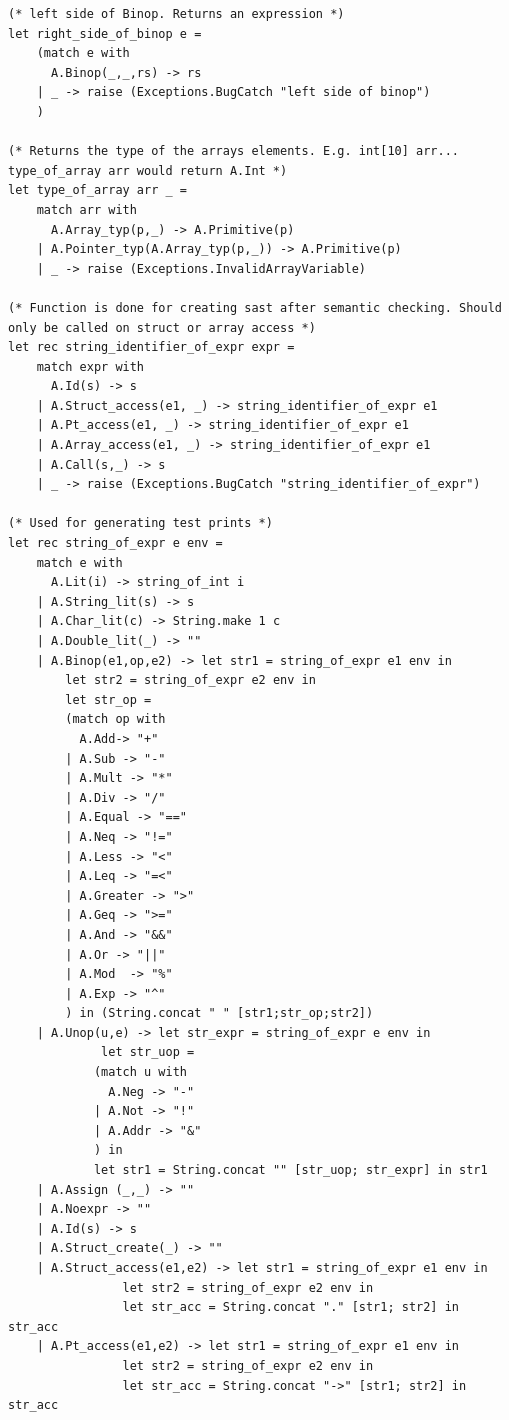 \documentclass{article}
\begin{document}
\begin{lstlisting}
(* left side of Binop. Returns an expression *)
let right_side_of_binop e =
	(match e with 
	  A.Binop(_,_,rs) -> rs
	| _ -> raise (Exceptions.BugCatch "left side of binop")
	)

(* Returns the type of the arrays elements. E.g. int[10] arr... type_of_array arr would return A.Int *)
let type_of_array arr _ =
	match arr with
	  A.Array_typ(p,_) -> A.Primitive(p)
	| A.Pointer_typ(A.Array_typ(p,_)) -> A.Primitive(p)
	| _ -> raise (Exceptions.InvalidArrayVariable)

(* Function is done for creating sast after semantic checking. Should only be called on struct or array access *)
let rec string_identifier_of_expr expr = 
	match expr with
	  A.Id(s) -> s
	| A.Struct_access(e1, _) -> string_identifier_of_expr e1 
	| A.Pt_access(e1, _) -> string_identifier_of_expr e1 
	| A.Array_access(e1, _) -> string_identifier_of_expr e1
	| A.Call(s,_) -> s
	| _ -> raise (Exceptions.BugCatch "string_identifier_of_expr")

(* Used for generating test prints *)
let rec string_of_expr e env =
	match e with 
	  A.Lit(i) -> string_of_int i
  	| A.String_lit(s) -> s
  	| A.Char_lit(c) -> String.make 1 c
  	| A.Double_lit(_) -> ""
  	| A.Binop(e1,op,e2) -> let str1 = string_of_expr e1 env in 
		let str2 = string_of_expr e2 env in 
		let str_op = 
		(match op with
		  A.Add-> "+"
		| A.Sub -> "-"
		| A.Mult -> "*"
		| A.Div -> "/"
		| A.Equal -> "=="
		| A.Neq -> "!="
		| A.Less -> "<"
		| A.Leq -> "=<"
		| A.Greater -> ">"
		| A.Geq -> ">="
		| A.And -> "&&"
		| A.Or -> "||"
		| A.Mod  -> "%"
		| A.Exp -> "^"
		) in (String.concat " " [str1;str_op;str2])
  	| A.Unop(u,e) -> let str_expr = string_of_expr e env in
			 let str_uop = 
			(match u with
			  A.Neg -> "-"
			| A.Not -> "!"
			| A.Addr -> "&"
			) in
			let str1 = String.concat "" [str_uop; str_expr] in str1
  	| A.Assign (_,_) -> ""
  	| A.Noexpr -> ""
  	| A.Id(s) -> s
  	| A.Struct_create(_) -> ""
  	| A.Struct_access(e1,e2) -> let str1 = string_of_expr e1 env in
				let str2 = string_of_expr e2 env in
				let str_acc = String.concat "." [str1; str2] in str_acc
  	| A.Pt_access(e1,e2) -> let str1 = string_of_expr e1 env in
				let str2 = string_of_expr e2 env in
				let str_acc = String.concat "->" [str1; str2] in str_acc


\end{lstlisting}
\end{document}

